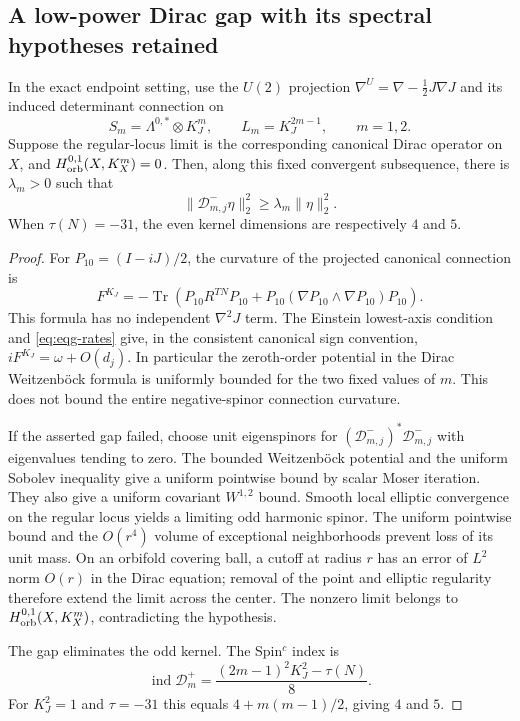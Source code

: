 \subsection{A low-power Dirac gap with its spectral hypotheses retained}

\begin{lemma}\label{lem:eqg-dirac}
In the exact endpoint setting, use the $U(2)$ projection
$\nabla^U=\nabla-\tfrac12J\nabla J$ and its induced determinant
connection on
\[
 S_m=\Lambda^{0,*}\otimes K_J^m,
 \qquad L_m=K_J^{2m-1},\qquad m=1,2.
\]
Suppose the regular-locus limit is the corresponding canonical
Dirac operator on $X$, and
$H^{0,1}_{\rm orb}(X,K_X^m)=0$.
Then, along this fixed convergent subsequence, there is $\lambda_m>0$
such that
\[
 \|\mathcal D^-_{m,j}\eta\|_2^2
 \geq\lambda_m\|\eta\|_2^2.
\]
When $\tau(N)=-31$, the even kernel dimensions are respectively
$4$ and $5$.
\end{lemma}

\begin{proof}
For $P_{10}=(I-iJ)/2$, the curvature of the projected canonical
connection is
\[
 F^{K_J}=-\operatorname{Tr}\left(
 P_{10}R^{TN}P_{10}
 +P_{10}(\nabla P_{10}\wedge\nabla P_{10})P_{10}\right).
\]
This formula has no independent $\nabla^2J$ term.  The Einstein
lowest-axis condition and \eqref{eq:eqg-rates} give, in the consistent
canonical sign convention, $iF^{K_J}=\omega+O(d_j)$.
In particular the zeroth-order potential in the Dirac Weitzenböck
formula is uniformly bounded for the two fixed values of $m$.
This does not bound the entire negative-spinor connection curvature.

If the asserted gap failed, choose unit eigenspinors for
$(\mathcal D^-_{m,j})^*\mathcal D^-_{m,j}$ with eigenvalues tending
to zero.  The bounded Weitzenböck potential and the uniform Sobolev
inequality give a uniform pointwise bound by scalar Moser iteration.
They also give a uniform covariant $W^{1,2}$ bound.  Smooth local
elliptic convergence on the regular locus yields a limiting odd
harmonic spinor.  The uniform pointwise bound and the $O(r^4)$
volume of exceptional neighborhoods prevent loss of its unit mass.
On an orbifold covering ball, a cutoff at radius $r$ has an error
of $L^2$ norm $O(r)$ in the Dirac equation; removal of the point and
elliptic regularity therefore extend the limit across the center.
The nonzero limit belongs to $H^{0,1}_{\rm orb}(X,K_X^m)$,
contradicting the hypothesis.

The gap eliminates the odd kernel.  The Spin$^c$ index is
\[
 \operatorname{ind}\mathcal D^+_m
 =\frac{(2m-1)^2K_J^2-\tau(N)}8.
\]
For $K_J^2=1$ and $\tau=-31$ this equals
$4+m(m-1)/2$, giving $4$ and $5$.
\end{proof}

